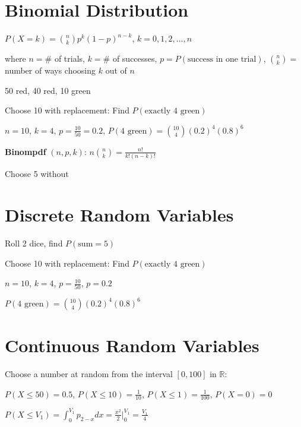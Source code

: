 \section{Binomial Distribution}

\begin{definition}
$P(X = k) = \binom{n}{k} p^k (1-p)^{n-k}$, $k = 0, 1, 2, \ldots, n$

where $n = \#$ of trials, $k = \#$ of successes, $p = P(\text{success in one trial})$, $\binom{n}{k} = $ number of ways choosing $k$ out of $n$
\end{definition}

\begin{example}
50 red, 40 red, 10 green

Choose 10 with replacement: Find $P(\text{exactly 4 green})$

$n = 10$, $k = 4$, $p = \frac{10}{50} = 0.2$, $P(4 \text{ green}) = \binom{10}{4}(0.2)^4(0.8)^6$
\end{example}

\textbf{Binompdf} $(n, p, k)$: $n \binom{n}{k} = \frac{n!}{k!(n-k)!}$

Choose 5 without

\section{Discrete Random Variables}

\begin{example}
Roll 2 dice, find $P(\text{sum} = 5)$

Choose 10 with replacement: Find $P(\text{exactly 4 green})$

$n = 10$, $k = 4$, $p = \frac{10}{50}$, $p = 0.2$

$P(4 \text{ green}) = \binom{10}{4}(0.2)^4(0.8)^6$
\end{example}

\section{Continuous Random Variables}

\begin{example}
Choose a number at random from the interval $[0, 100]$ in $\mathbb{R}$:

$P(X \leq 50) = 0.5$, $P(X \leq 10) = \frac{1}{10}$, $P(X \leq 1) = \frac{1}{100}$, $P(X = 0) = 0$

$P(X \leq V_1) = \int_0^{V_1} p_{2-x} dx = \frac{x^2}{2} \Big|_0^{V_1} = \frac{V_1}{4}$
\end{example}

